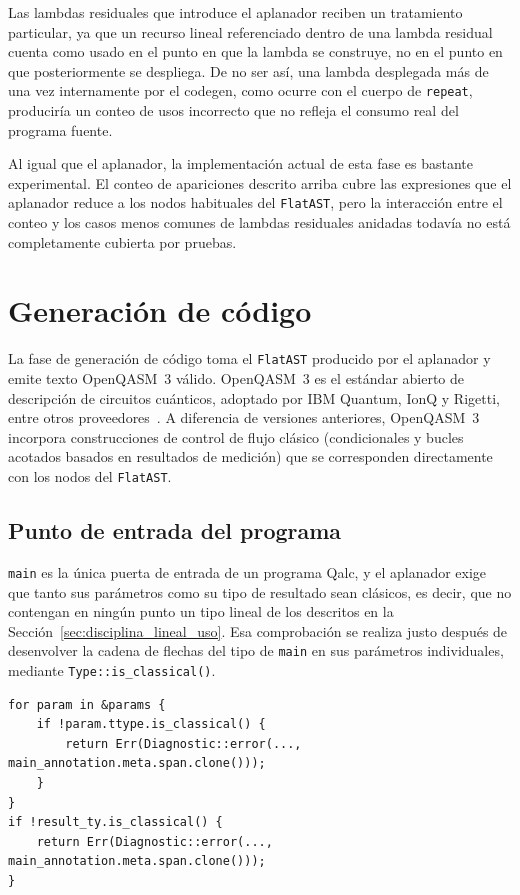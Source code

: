 Las lambdas residuales que introduce el aplanador reciben un tratamiento particular, ya que un recurso lineal referenciado dentro de una lambda residual cuenta como usado en el punto en que la lambda se construye, no en el punto en que posteriormente se despliega. De no ser así, una lambda desplegada más de una vez internamente por el codegen, como ocurre con el cuerpo de \lstinline|repeat|, produciría un conteo de usos incorrecto que no refleja el consumo real del programa fuente.

Al igual que el aplanador, la implementación actual de esta fase es bastante experimental. El conteo de apariciones descrito arriba cubre las expresiones que el aplanador reduce a los nodos habituales del \lstinline|FlatAST|, pero la interacción entre el conteo y los casos menos comunes de lambdas residuales anidadas todavía no está completamente cubierta por pruebas.

\section{Generación de código}
\label{sec:codegen}

La fase de generación de código toma el \lstinline|FlatAST| producido por el aplanador y emite texto OpenQASM~3 válido. OpenQASM~3 es el estándar abierto de descripción de circuitos cuánticos, adoptado por IBM Quantum, IonQ y Rigetti, entre otros proveedores~\cite{openqasm3_2022}. A diferencia de versiones anteriores, OpenQASM~3 incorpora construcciones de control de flujo clásico (condicionales y bucles acotados basados en resultados de medición) que se corresponden directamente con los nodos del \lstinline|FlatAST|.

\subsection{Punto de entrada del programa}
\label{sec:entry-point}

\lstinline|main| es la única puerta de entrada de un programa Qalc, y el aplanador exige que tanto sus parámetros como su tipo de resultado sean clásicos, es decir, que no contengan en ningún punto un tipo lineal de los descritos en la Sección~\ref{sec:disciplina_lineal_uso}. Esa comprobación se realiza justo después de desenvolver la cadena de flechas del tipo de \lstinline|main| en sus parámetros individuales, mediante \lstinline|Type::is_classical()|.

\begin{lstlisting}[language={}, caption=Comprobación de que los parámetros y el resultado de main son clásicos]
for param in &params {
    if !param.ttype.is_classical() {
        return Err(Diagnostic::error(..., main_annotation.meta.span.clone()));
    }
}
if !result_ty.is_classical() {
    return Err(Diagnostic::error(..., main_annotation.meta.span.clone()));
}
\end{lstlisting}

